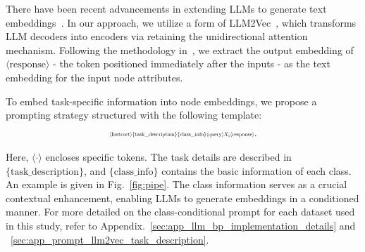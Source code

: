 There have been recent advancements in extending LLMs to generate text embeddings~\cite{behnamghader2024llm2vec, muennighoff2022mteb}. In our approach, we utilize a form of LLM2Vec~\cite{behnamghader2024llm2vec}, which transforms LLM decoders into encoders via retaining the unidirectional attention mechanism. Following the methodology 
 in~\cite{li2024making}, we extract the output embedding of $\langle\text{response}\rangle$ - the token positioned immediately after the inputs - as the text embedding for the input node attributes.

To embed task-specific information into node embeddings, we propose a prompting strategy structured with the following template:
\begin{align}
\label{eq:task_adaptive_llm2vec}
\resizebox{0.43 \textwidth}{!}{$\langle\text{Instruct}\rangle \{\text{task\_description}\} \{\text{class\_info}\} \langle\text{query}\rangle {X_i} \langle\text{response}\rangle$}.
\end{align}

Here, $\langle \cdot \rangle$ encloses specific tokens. The task details are described in $\{\text{task\_description}\}$, and $\{\text{class\_info}\}$ contains the basic information of each class. An example is given in Fig.~\ref{fig:pipe}.
The class information serves as a crucial contextual enhancement, enabling LLMs to generate embeddings in a conditioned manner. %
For more detailed on the class-conditional prompt for each dataset used in this study, refer to Appendix.~\ref{sec:app_llm_bp_implementation_details} and ~\ref{sec:app_prompt_llm2vec_task_description}.






